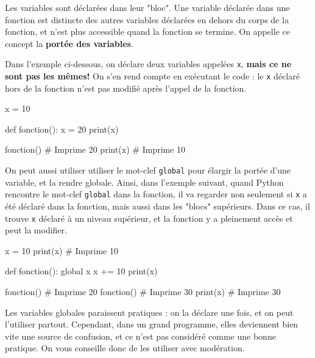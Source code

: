 Les variables sont déclarées dans leur "bloc". Une variable déclarée dans une fonction est distincte des autres variables déclarées en dehors du corps de la fonction, et n'est plus accessible quand la fonction se termine. On appelle ce concept la \textbf{portée des variables}.

Dans l'exemple ci-dessous, on déclare deux variables appelées \texttt{x}, \textbf{mais ce ne sont pas les mêmes!} On s'en rend compte en exécutant le code : le \texttt{x} déclaré hors de la fonction n'est pas modifié après l'appel de la fonction.

\begin{python}
x = 10

def fonction():
    x = 20
    print(x)

fonction() # Imprime 20
print(x) # Imprime 10
\end{python}

On peut aussi utiliser utiliser le mot-clef \texttt{global} pour élargir la portée d'une variable, et la rendre globale. Ainsi, dans l'exemple suivant, quand Python rencontre le mot-clef \texttt{global} dans la fonction, il va regarder non seulement si \texttt{x} a été déclaré dans la fonction, mais aussi dans les "blocs" supérieurs. Dans ce cas, il trouve \texttt{x} déclaré à un niveau supérieur, et la fonction y a pleinement accès et peut la modifier.

\begin{python}
x = 10
print(x) # Imprime 10

def fonction():
    global x
    x += 10
    print(x)

fonction() # Imprime 20
fonction() # Imprime 30
print(x) # Imprime 30
\end{python}

Les variables globales paraissent pratiques : on la déclare une fois, et on peut l'utiliser partout. Cependant, dans un grand programme, elles deviennent bien vite une source de confusion, et ce n'est pas considéré comme une bonne pratique. On vous conseille donc de les utiliser avec modération.
